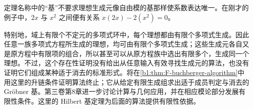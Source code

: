 \ProseParagraphBreak
定理名称中的“基”不要求理想生成元像自由模的基那样使系数表达唯一。在刚才的例子中，\(2x\) 与 \(x^2\) 之间便有关系 \(x(2x)-2(x^2)=0\)。

\ProseParagraphBreak
特别地，域上有限个不定元的多项式环中，每个理想都由有限个多项式生成。因此任意一族多项式方程所生成的理想，均可由有限个多项式生成；这些生成元各自又是原方程中有限项的组合，所以甚至可以从原方程族中选出有限多个，生成同一个理想。不过，这个存在性证明没有给出从任意输入有效寻找生成元的算法，也没有证明它们组成某种适于消去的标准形式。将在\cref{b1:thm:F-buchberger-algorithm}中用这里的升链条件证明算法终止；它从给定有限生成组求出适于成员判定与消去的 Gröbner 基。第三卷第8章进一步讨论计算与几何应用，并在相应模论部分发展有限性条件。这里的 Hilbert 基定理为后面的算法提供有限性依据。
